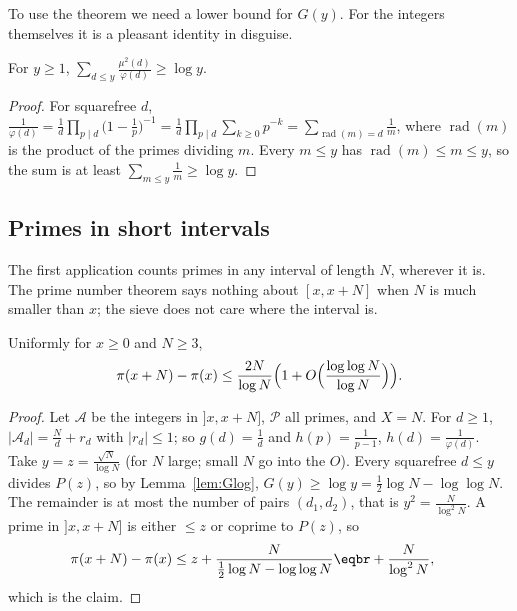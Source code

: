 To use the theorem we need a lower bound for $G(y)$. For the integers themselves it is a pleasant identity in disguise.

\begin{lemma}\label{lem:Glog}
For $y\ge1$, $\displaystyle\sum_{d\le y}\frac{\mu^2(d)}{\varphi(d)}\ge\log y$.
\end{lemma}
\begin{proof}
For squarefree $d$, $\frac1{\varphi(d)}=\frac1d\prod_{p\mid d}\bigl(1-\frac1p\bigr)^{-1}=\frac1d\prod_{p\mid d}\sum_{k\ge0}p^{-k}=\sum_{\operatorname{rad}(m)=d}\frac1m$, where $\operatorname{rad}(m)$ is the product of the primes dividing $m$. Every $m\le y$
has $\operatorname{rad}(m)\le m\le y$, so the sum is at least $\sum_{m\le y}\frac1m\ge\log y$.
\end{proof}

\subsection*{Primes in short intervals}

The first application counts primes in any interval of length $N$, wherever it is. The prime number theorem says nothing about $[x,x+N]$ when $N$ is much smaller than $x$; the sieve
does not care where the interval is.

\begin{theorem}\label{thm:bt}
Uniformly for $x\ge0$ and $N\ge3$,
\[
\pi(x+N)-\pi(x)\le\frac{2N}{\log N}\Bigl(1+O\Bigl(\frac{\log\log N}{\log N}\Bigr)\Bigr).
\]
\end{theorem}
\begin{proof}
Let $\mathcal A$ be the integers in $]x,x+N]$, $\mathcal P$ all primes, and $X=N$. For $d\ge1$, $|\mathcal A_d|=\frac Nd+r_d$ with $|r_d|\le1$; so $g(d)=\frac1d$ and $h(p)=\frac1{p-1}$, $h(d)=\frac1{\varphi(d)}$. Take
$y=z=\frac{\sqrt N}{\log N}$ (for $N$ large; small $N$ go into the $O$). Every squarefree $d\le y$ divides $P(z)$, so by Lemma~\ref{lem:Glog}, $G(y)\ge\log y=\frac12\log N-\log\log N$. The remainder
is at most the number of pairs $(d_1,d_2)$, that is $y^2=\frac N{\log^2N}$. A prime in $]x,x+N]$ is either $\le z$ or coprime to $P(z)$, so
\[
\begin{aligned}\pi(x+N)-\pi(x)&\le z+\frac N{\frac12\log N-\log\log N}\eqbr+\frac N{\log^2N},\end{aligned}
\]
which is the claim.
\end{proof}

